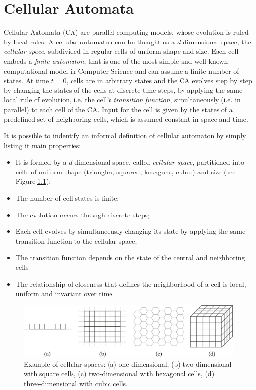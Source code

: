 \chapter{Cellular Automata}

Cellular Automata (CA) are parallel computing models, whose evolution
is ruled by local rules. A cellular automaton can be thought as a
$d$-dimensional space, the \emph{cellular space}, subdivided in
regular cells of uniform shape and size. Each cell embeds a
\emph{finite automaton}, that is one of the most simple and well known
computational model in Computer Science and can assume a finite number
of states. At time $t=0$, cells are in arbitrary states and the CA
evolves step by step by changing the states of the cells at discrete
time steps, by applying the same local rule of evolution, i.e. the
cell's \emph{transition function}, simultaneously (i.e. in parallel)
to each cell of the CA. Input for the cell is given by the states of a
predefined set of neighboring cells, which is assumed constant in
space and time.

It is possible to indentify an informal definition of cellular
automaton by simply listing it main properties:

\begin{itemize}
\item It is formed by a $d$-dimensional space, called \emph{cellular
  space}, partitioned into cells of uniform shape (triangles, squared,
  hexagons, cubes) and size (see Figure \ref{fig:CellularSpaces});
\item The number of cell states is finite;
\item The evolution occurs through discrete steps;
\item Each cell evolves by simultaneously changing its state by
  applying the same transition function to the cellular space;
\item The transition function depends on the state of the central and
  neighboring cells
\item The relationship of closeness that defines the neighborhood of a
  cell is local, uniform and invariant over time.
\end{itemize}

\begin{figure}
  \begin{center}
    \includegraphics[width=12cm]{images/CellularAutomata/CellularSpaces}
    \caption{Example of cellular spaces: (a) one-dimensional, (b)
      two-dimensional with square cells, (c) two-dimensional with
      hexagonal cells, (d) three-dimensional with cubic cells.}
    \label{fig:CellularSpaces}
  \end{center}
\end{figure}

